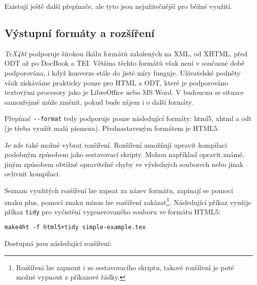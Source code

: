 \documentclass{csbulletin}
\newcommand\nazev[1]{\textit{#1}}
\newcommand\prikaz[1]{\texttt{#1}}
\newcommand\prepinac[1]{\texttt{-\/-#1}}
\begin{document}
Existují ještě další přepínače, ale tyto jsou nejužitečnější pro běžné využití.

\subsection{Výstupní formáty a rozšíření}

\nazev{TeX4ht} podporuje širokou škálu formátů založených na XML, od XHTML,
před ODT až po DocBook a TEI. Většina těchto formátů však není v současné době
podporována, i když konverze stále do jisté míry funguje. Uživatelské podněty
však získáváme prakticky pouze pro HTML a ODT, které je podporováno textovými
procesory jako je LibreOffice nebo MS Word. V budoucnu se situace samozřejmě
může změnit, pokud bude zájem i o další formáty.

Přepínač \prepinac{format} tedy podporuje pouze následující formáty: html5,
xhtml a odt (je třeba využít malá písmena). Přednastaveným formátem je HTML5.

Je zde také možné vybrat rozšíření. Rozšíření umožňují upravit kompilaci
podobným způsobem jako sestavovací skripty. Mohou například opravit známé,
jiným způsobem obtížně opravitelné chyby ve výsledných souborech nebo jinak
ovlivnit kompilaci.

Seznam využitých rozšíření lze zapsat za název formátu, zapínají se pomocí
znaku plus, pomocí znaku mínus lze rozšíření zakázat\footnote{Rozšíření lze
  zapnout i ze sestavovacího skriptu, takové rozšíření je poté možné vypnout z
příkazové řádky.}. Následující příkaz využije příkaz \prikaz{tidy} pro
vyčistění vygenerovaného souboru ve formátu HTML5:

\begin{verbatim}
make4ht -f html5+tidy simple-example.tex
\end{verbatim}

Dostupná jsou následující rozšíření:
\end{document}
